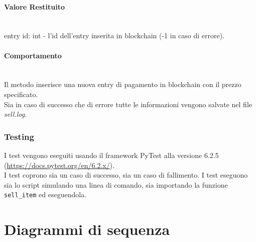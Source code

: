 \documentclass[a4paper, 12pt]{article}
\begin{document}
\paragraph{Valore Restituito}\\
entry id: int - l'id dell'entry inserita in blockchain (-1 in caso di errore).
\paragraph{Comportamento}\\
Il metodo inserisce una nuova entry di pagamento in blockchain con il prezzo specificato.\\
Sia in caso di successo che di errore tutte le informazioni vengono salvate nel file \textit{sell.log}.
\subsubsection{Testing}
I test vengono eseguiti usando il framework PyTest alla versione 6.2.5 (\href{https://docs.pytest.org/en/6.2.x/}{https://docs.pytest.org/en/6.2.x/}). \\
I test coprono sia un caso di successo, sia un caso di fallimento. I test eseguono sia lo script simulando una linea di comando, sia importando la funzione \texttt{sell\_item} ed eseguendola.

\section{Diagrammi di sequenza}
\end{document}
